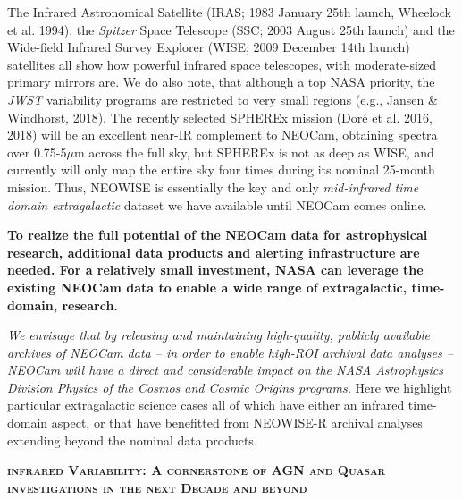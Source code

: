 \documentclass[12pt]{article}
\begin{document}
\smallskip
\noindent
The Infrared Astronomical Satellite (IRAS; 1983 January 25th launch, Wheelock et al. 1994), the {\it Spitzer} Space Telescope (SSC; 2003 August 25th launch) and the Wide-field Infrared Survey Explorer (WISE; 2009 December 14th launch) satellites all show how powerful infrared space telescopes, with moderate-sized primary mirrors are. We do also note, that although a top NASA priority, the {\it JWST} variability programs are restricted to very small regions (e.g., Jansen \&  Windhorst, 2018). The recently selected SPHEREx mission (Dor{\'e} et al. 2016, 2018) will be an excellent near-IR complement to NEOCam, obtaining spectra over 0.75-5$\mu$m across the full sky, but SPHEREx is not as deep as WISE, and currently will only map the entire sky four times during its nominal 25-month mission. Thus, NEOWISE is essentially the key and only {\it mid-infrared time domain extragalactic} dataset we have available until NEOCam comes online.

\smallskip
\smallskip
\noindent
{\bf To realize the full potential of the NEOCam data for
astrophysical research, additional data products and alerting
infrastructure are needed. For a relatively small investment, NASA can
leverage the existing NEOCam data to enable a wide range of
extragalactic, time-domain, research.}

\smallskip
\smallskip
\noindent
{\it We envisage that by releasing and maintaining high-quality, publicly available archives of NEOCam data -- 
in order to enable high-ROI archival data analyses -- 
NEOCam will have a direct and considerable impact on the NASA Astrophysics Division {\it Physics of the Cosmos} and {\it Cosmic Origins} programs.}
Here we highlight particular extragalactic science cases all of which have either an infrared time-domain aspect, or that have benefitted from NEOWISE-R archival analyses extending beyond the nominal data products. 


\smallskip
\smallskip
\noindent
{\bfseries \textsc{\textcolor{Cerulean}{infrared Variability: A
cornerstone of AGN and Quasar investigations in the next Decade and
beyond}}} 
\end{document}
